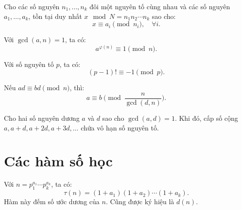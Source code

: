 \documentclass[../imo-training-open-book.tex]{subfiles}
\begin{document}
\vspace{1em}

\begin{theorem}
    \label{theorem:chinese-remainder-theorem}
    Cho các số nguyên \( n_1, \dots, n_k \) đôi một nguyên tố cùng nhau và các số nguyên \( a_1, \dots, a_k \),
    tồn tại duy nhất \( x \mod N = n_1n_2\cdots n_k \) sao cho:
    \[
        x \equiv a_i \pmod{n_i},\quad \forall i.
    \]
\end{theorem}

\vspace{1em}

\begin{theorem}
    \label{theorem:euler}
    Với \( \gcd(a, n) = 1 \), ta có:
    \[
        a^{\varphi(n)} \equiv 1 \pmod{n}.
    \]
\end{theorem}

\vspace{1em}

\begin{theorem}
    \label{theorem:wilson}
    Với số nguyên tố \( p \), ta có:
    \[
        (p - 1)! \equiv -1 \pmod{p}.
    \]
\end{theorem}

\vspace{1em}

\begin{theorem}
    \label{theorem:cancel-modulo}
    Nếu \( ad \equiv bd \pmod{n} \), thì:
    \[
        a \equiv b \pmod{\frac{n}{\gcd(d,n)}}.
    \]
\end{theorem}

\begin{theorem}
    \label{theorem:dirichlet-ap}
    Cho hai số nguyên dương \( a \) và \( d \) sao cho \(\gcd(a,d) = 1\). Khi đó, cấp số cộng \( a, a+d, a+2d, a+3d, \ldots \) chứa vô hạn số nguyên tố.
\end{theorem}

\newpage

\section{Các hàm số học}

\begin{definition}
    \label{definition:tau-function}
    Với \( n = p_1^{a_1} \cdots p_k^{a_k} \), ta có:
    \[
        \tau(n) = (1 + a_1)(1 + a_2) \cdots (1 + a_k).
    \]
    Hàm này đếm số ước dương của \( n \). Cũng được ký hiệu là \( d(n) \).
\end{definition}
\end{document}

